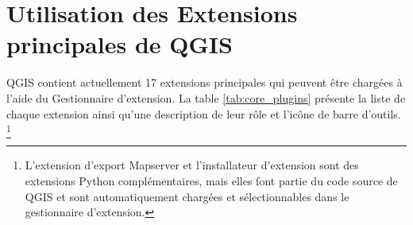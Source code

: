 
\section{Utilisation des Extensions principales de QGIS}\label{sec:core_plugins}



QGIS contient actuellement 17 extensions principales qui peuvent être chargées à l'aide du Gestionnaire d'extension.
La table \ref{tab:core_plugins} présente la liste de chaque extension ainsi qu'une 
description de leur rôle et l'icône de barre d'outils. \footnote{L'extension d'export 
Mapserver et l'installateur d'extension sont des extensions Python complémentaires, 
mais elles font partie du code source de QGIS et sont automatiquement chargées et sélectionnables 
dans le gestionnaire d'extension.}


